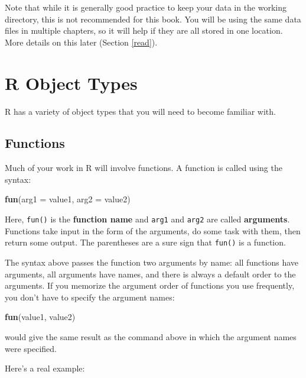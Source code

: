 \documentclass[]{book}
\newenvironment{Shaded}{\begin{snugshade}}{\end{snugshade}}
\newcommand{\KeywordTok}[1]{\textcolor[rgb]{0.13,0.29,0.53}{\textbf{#1}}}
\newcommand{\DataTypeTok}[1]{\textcolor[rgb]{0.13,0.29,0.53}{#1}}
\newcommand{\NormalTok}[1]{#1}
\theoremstyle{definition}
\theoremstyle{definition}
\theoremstyle{definition}
\theoremstyle{remark}
\begin{document}
Note that while it is generally good practice to keep your data in the
working directory, this is not recommended for this book. You will be
using the same data files in multiple chapters, so it will help if they
are all stored in one location. More details on this later (Section
\ref{read}).

\section{R Object Types}\label{r-object-types}

R has a variety of object types that you will need to become familiar
with.

\subsection{Functions}\label{functions}

Much of your work in R will involve functions. A function is called
using the syntax:

\begin{Shaded}
\begin{Highlighting}[]
\KeywordTok{fun}\NormalTok{(}\DataTypeTok{arg1 =}\NormalTok{ value1, }\DataTypeTok{arg2 =}\NormalTok{ value2)}
\end{Highlighting}
\end{Shaded}

Here, \texttt{fun()} is the \textbf{function name} and \texttt{arg1} and
\texttt{arg2} are called \textbf{arguments}. Functions take input in the
form of the arguments, do some task with them, then return some output.
The parentheses are a sure sign that \texttt{fun()} is a function.

The syntax above passes the function two arguments by name: all
functions have arguments, all arguments have names, and there is always
a default order to the arguments. If you memorize the argument order of
functions you use frequently, you don't have to specify the argument
names:

\begin{Shaded}
\begin{Highlighting}[]
\KeywordTok{fun}\NormalTok{(value1, value2)}
\end{Highlighting}
\end{Shaded}

would give the same result as the command above in which the argument
names were specified.

Here's a real example:
\end{document}
